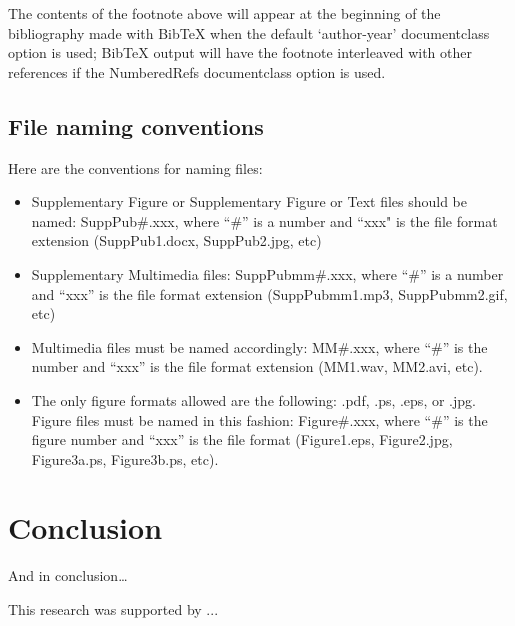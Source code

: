 \documentclass[preprint]{JASA}
\begin{document}
The contents of the footnote above will appear at the beginning of the
bibliography made with BibTeX when the default `author-year' documentclass option is used;
BibTeX output will have the footnote interleaved with other
references if the NumberedRefs documentclass option is used.

\subsection{File naming conventions}
Here are the conventions for naming files:

\begin{itemize}
\item
Supplementary Figure or
	Supplementary Figure or Text files should be named: SuppPub\#.xxx, where ``\#'' is
	a number and ``xxx" is the file format extension
	(SuppPub1.docx, SuppPub2.jpg, etc)

\item
	Supplementary Multimedia files: SuppPubmm\#.xxx, where ``\#'' is a
	number and ``xxx'' is the file format extension (SuppPubmm1.mp3,
	SuppPubmm2.gif, etc)

\item
Multimedia files must be named accordingly: MM\#.xxx, where ``\#'' is the
number and ``xxx'' is the file format extension (MM1.wav, MM2.avi, etc).

\item
The only figure formats allowed are the following: 
.pdf, .ps, .eps, or .jpg. Figure files must be named in this fashion:
Figure\#.xxx, where ``\#'' is the figure number and ``xxx'' is the file format
(Figure1.eps, Figure2.jpg, Figure3a.ps, Figure3b.ps, etc). 

\end{itemize}


\section{\label{sec:5}Conclusion}

And in conclusion\ldots

\begin{acknowledgments}
This research was supported by  ...
\end{acknowledgments}




\appendix
\end{document}
